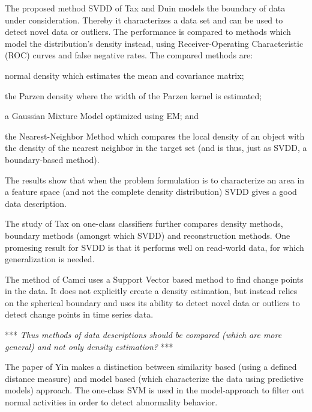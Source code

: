 The proposed method SVDD of Tax and Duin \cite{tax1999support, tax2004support} models the boundary of data under consideration.
Thereby it characterizes a data set and can be used to detect novel data or outliers.
The performance is compared to methods which model the distribution's density instead, using Receiver-Operating Characteristic (ROC) curves and false negative rates.
The compared methods are:
\begin{inparaenum}[\itshape (1)]
  \item normal density which estimates the mean and covariance matrix;
  \item the Parzen density where the width of the Parzen kernel is estimated;
  \item a Gaussian Mixture Model optimized using EM; and
  \item the Nearest-Neighbor Method which compares the local density of an object with the density of the nearest neighbor in the target set (and is thus, just as SVDD, a boundary-based method).
\end{inparaenum}
The results show that when the problem formulation is to characterize an area in a feature space (and not the complete density distribution) SVDD gives a good data description.

The study of Tax on one-class classifiers \cite{tax2001one} further compares density methods, boundary methods (amongst which SVDD) and reconstruction methods.
One promesing result for SVDD is that it performs well on read-world data, for which generalization is needed.

The method of Camci \cite{camci2010change} uses a Support Vector based method to find change points in the data.
It does not explicitly create a density estimation, but instead relies on the spherical boundary and uses its ability to detect novel data or outliers to detect change points in time series data.

*** \emph{Thus methods of data descriptions should be compared (which are more general) and not only density estimation?} ***

The paper of Yin \etal \cite{yin2008sensor} makes a distinction between similarity based (using a defined distance measure) and model based (which characterize the data using predictive models) approach.
The one-class SVM is used in the model-approach to filter out normal activities in order to detect abnormality behavior.


